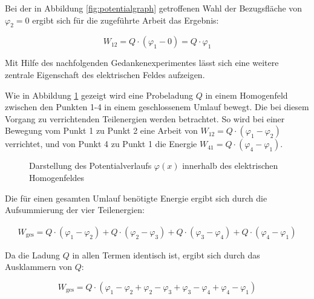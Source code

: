 \begin{frame}
{	Bei der in Abbildung \ref{fig:potentialgraph} getroffenen Wahl der Bezugsfläche von $\varphi_2 = 0$ ergibt sich für die zugeführte Arbeit 
	das Ergebnis:

	\begin{equation*}
		W_{12} = Q \cdot (\varphi_1 - 0) = Q \cdot \varphi_1
	\end{equation*}


	Mit Hilfe des nachfolgenden Gedankenexperimentes lässt sich eine weitere zentrale Eigenschaft des elektrischen Feldes aufzeigen.

	Wie in Abbildung \ref{fig:wirbelfrei} gezeigt wird eine Probeladung $Q$ in einem Homogenfeld 
	zwischen den Punkten 1-4 in einem geschlossenem Umlauf bewegt. Die bei diesem Vorgang zu verrichtenden Teilenergien werden betrachtet.
	So wird bei einer Bewegung vom Punkt 1 zu Punkt 2 eine Arbeit von $W_{12} = Q \cdot (\varphi_1 - \varphi_2)$ verrichtet, 
	und von Punkt 4 zu Punkt 1 die Energie $W_{41} = Q \cdot (\varphi_4 - \varphi_1)$.

	\begin{figure}[ht]
		\centering
		\caption{Darstellung des Potentialverlaufs $\varphi(x)$ innerhalb des elektrischen Homogenfeldes}
		\label{fig:wirbelfrei}

	\end{figure}

	Die für einen gesamten Umlauf benötigte Energie ergibt sich durch die Aufsummierung der vier Teilenergien: 

	\begin{equation*}
		\begin{split}
			W_\mathrm{ges} = Q \cdot (\varphi_1 - \varphi_2) + Q \cdot (\varphi_2 - \varphi_3)
			+ Q \cdot (\varphi_3 - \varphi_4) + Q \cdot (\varphi_4 - \varphi_1)
		\end{split}
	\end{equation*}

	Da die Ladung $Q$ in allen Termen identisch ist, ergibt sich durch das Ausklammern von $Q$:


	\begin{equation*}
			W_\mathrm{ges} = Q \cdot (\varphi_1 - \varphi_2 + \varphi_2 - \varphi_3
			+ \varphi_3 - \varphi_4 + \varphi_4 - \varphi_1) 
	\end{equation*}
	
}
\end{frame}
